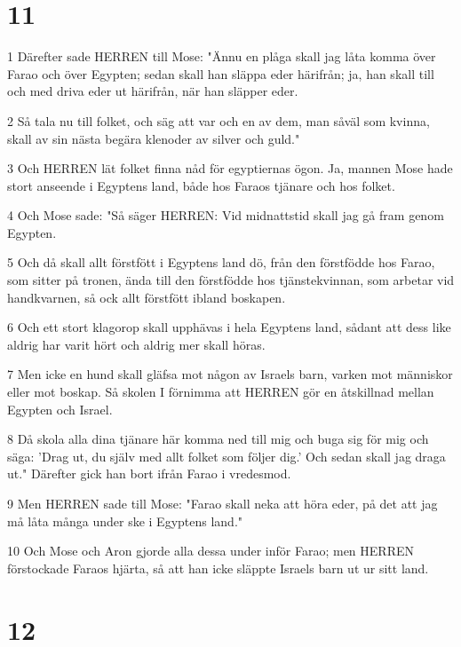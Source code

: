 \chapter{11}

\par 1 Därefter sade HERREN till Mose: "Ännu en plåga skall jag låta komma över Farao och över Egypten; sedan skall han släppa eder härifrån; ja, han skall till och med driva eder ut härifrån, när han släpper eder.
\par 2 Så tala nu till folket, och säg att var och en av dem, man såväl som kvinna, skall av sin nästa begära klenoder av silver och guld."
\par 3 Och HERREN lät folket finna nåd för egyptiernas ögon. Ja, mannen Mose hade stort anseende i Egyptens land, både hos Faraos tjänare och hos folket.
\par 4 Och Mose sade: "Så säger HERREN: Vid midnattstid skall jag gå fram genom Egypten.
\par 5 Och då skall allt förstfött i Egyptens land dö, från den förstfödde hos Farao, som sitter på tronen, ända till den förstfödde hos tjänstekvinnan, som arbetar vid handkvarnen, så ock allt förstfött ibland boskapen.
\par 6 Och ett stort klagorop skall upphävas i hela Egyptens land, sådant att dess like aldrig har varit hört och aldrig mer skall höras.
\par 7 Men icke en hund skall gläfsa mot någon av Israels barn, varken mot människor eller mot boskap. Så skolen I förnimma att HERREN gör en åtskillnad mellan Egypten och Israel.
\par 8 Då skola alla dina tjänare här komma ned till mig och buga sig för mig och säga: 'Drag ut, du själv med allt folket som följer dig.' Och sedan skall jag draga ut." Därefter gick han bort ifrån Farao i vredesmod.
\par 9 Men HERREN sade till Mose: "Farao skall neka att höra eder, på det att jag må låta många under ske i Egyptens land."
\par 10 Och Mose och Aron gjorde alla dessa under inför Farao; men HERREN förstockade Faraos hjärta, så att han icke släppte Israels barn ut ur sitt land.

\chapter{12}

